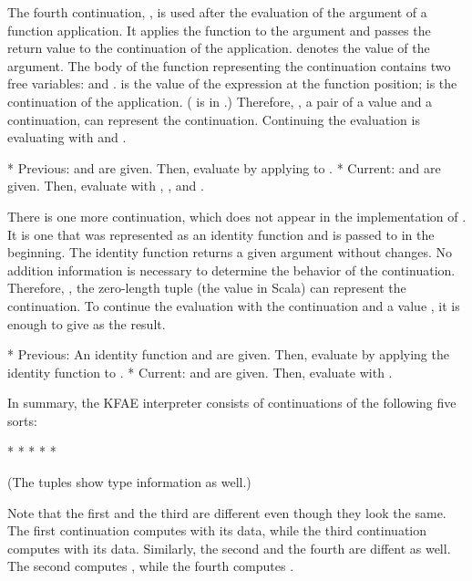 The fourth continuation, , is used after the
evaluation of the argument of a function application. It applies the function to
the argument and passes the return value to the continuation of the application.
 denotes the value of the argument. The body of the function
representing the continuation contains two free variables:  and
.  is the value of the expression at the function position;
 is the continuation of the application. ( is in .)
Therefore, , a pair of a value and a continuation, can represent
the continuation. Continuing the evaluation is evaluating 
with  and .

* Previous:  and  are given. Then, evaluate
 by applying  to .
* Current:  and  are given. Then, evaluate  with , , and .

There is one more continuation, which does not appear in the implementation of
. It is one that was represented as an identity function and is
passed to  in the beginning. The identity function returns a given
argument without changes. No addition information is necessary to determine the
behavior of the continuation. Therefore, \code{()}, the zero-length tuple (the
 value in Scala) can represent the continuation. To continue the
evaluation with the continuation and a value , it is enough to give
 as the result.

* Previous: An identity function and  are given. Then, evaluate 
by applying the identity function to .
* Current: \code{()} and  are given. Then, evaluate  with
.

In summary, the KFAE interpreter consists of continuations of the following five
sorts:

* 
* 
* 
* 
* \code{()}

(The tuples show type information as well.)

Note that the first and the third are different even though they look the same.
The first continuation computes  with its data, while the third continuation computes
 with its data. Similarly, the
second and the fourth are diffent as well. The second computes , while the fourth computes .

